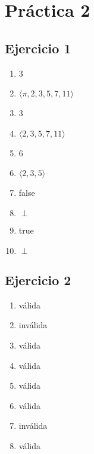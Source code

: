 
\usepackage{caratula}
\usepackage{enumerate}
\usepackage{hyperref}
\usepackage{graphicx}
\usepackage{amsfonts}
\usepackage{enumitem}

\decimalpoint
\hypersetup{colorlinks=true, linkcolor=black, urlcolor=blue}
\setlength{\parindent}{0em}
\setlength{\parskip}{0.5em}
\setcounter{tocdepth}{2} %
\setcounter{section}{1} %
\renewcommand{\thesubsubsection}{\thesubsection.\Alph{subsubsection}}
\graphicspath{ {images/} }





\maketitle
\newpage

\tableofcontents
\newpage


\section{Práctica 2}

\subsection{Ejercicio 1}

\begin{enumerate}[label=(\alph*)]
    \item 3
    \item $\langle \pi, 2, 3,5,7,11 \rangle$
    \item 3
    \item $\langle 2,3,5,7,11 \rangle$
    \item 6
    \item $\langle 2,3,5 \rangle$
    \item false
    \item $\perp$
    \item true
    \item $\perp$
\end{enumerate}

\subsection{Ejercicio 2}
\begin{enumerate}[label=(\alph*)]
    \item válida
    \item inválida
    \item válida
    \item válida
    \item válida
    \item válida
    \item inválida
    \item válida
\end{enumerate}

